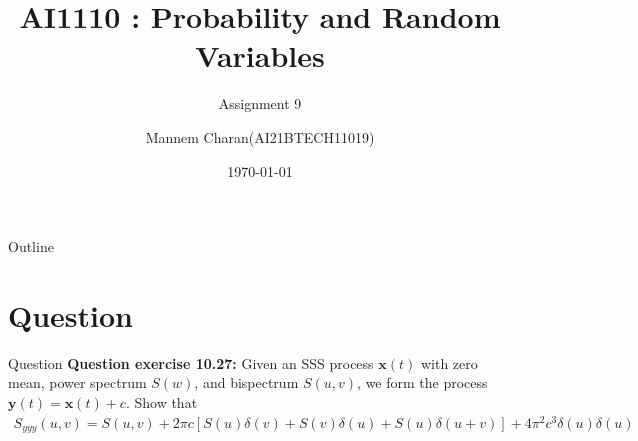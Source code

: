 \documentclass{beamer}
\title{AI1110 : Probability and Random Variables}
\subtitle{Assignment 9}
\author{Mannem Charan(AI21BTECH11019)}
\date{\today}
\providecommand{\sbrak}[1]{\ensuremath{{}\left[#1\right]}}
\providecommand{\brak}[1]{\ensuremath{\left(#1\right)}}
\begin{document}
\begin{frame}
    \titlepage 
\end{frame}


\begin{frame}{Outline}
    \tableofcontents
\end{frame}


\section{Question}
\begin{frame}{Question}
\textbf{Question exercise 10.27:} Given an SSS process $\mathbf{x}\brak{t}$ with zero mean, power spectrum $S\brak{w}$, and bispectrum $S\brak{u,v}$, we form the process $\mathbf{y}\brak{t} = \mathbf{x}\brak{t} + c$. Show that
        \begin{align}
            S_{yyy}\brak{u,v} = S\brak{u,v} + 2\pi c\sbrak{S\brak{u}\delta\brak{v} + S\brak{v}\delta\brak{u}+ S\brak{u}\delta\brak{u+v}} + 4\pi^{2}c^{3}\delta\brak{u}\delta\brak{u}
        \end{align}
\end{frame}
\end{document}
